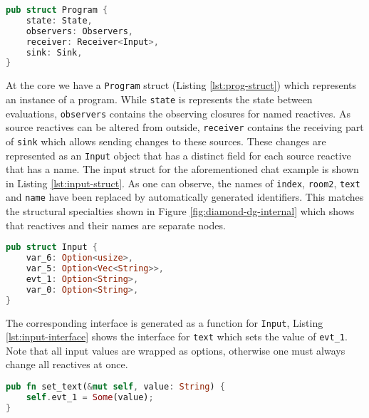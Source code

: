 \begin{lstlisting}[language=Rust,style=colouredRust,caption=Program struct,label=lst:prog-struct]
pub struct Program {
    state: State,
    observers: Observers,
    receiver: Receiver<Input>,
    sink: Sink,
}
\end{lstlisting}

At the core we have a \lstinline{Program} struct (Listing \ref{lst:prog-struct}) which represents an instance of a \rerust program. While \lstinline{state} is represents the state between evaluations, \lstinline{observers} contains the observing closures for named reactives. As source reactives can be altered from outside, \lstinline{receiver} contains the receiving part of \lstinline{sink} which allows sending changes to these sources. These changes are represented as an \lstinline{Input} object that has a distinct field for each source reactive that has a name. The input struct for the aforementioned chat example is shown in Listing \ref{lst:input-struct}. As one can observe, the names of \lstinline{index}, \lstinline{room2}, \lstinline{text} and \lstinline{name} have been replaced by automatically generated identifiers. This matches the structural specialties shown in Figure \ref{fig:diamond-dg-internal} which shows that reactives and their names are separate nodes. 

\begin{lstlisting}[language=Rust,style=colouredRust,caption=Input struct for chat example,label=lst:input-struct]
pub struct Input {
    var_6: Option<usize>,
    var_5: Option<Vec<String>>,
    evt_1: Option<String>,
    var_0: Option<String>,
}
\end{lstlisting}

The corresponding interface is generated as a function for \lstinline{Input}, Listing \ref{lst:input-interface} shows the interface for \lstinline{text} which sets the value of \lstinline{evt_1}. Note that all input values are wrapped as options, otherwise one must always change all reactives at once.

\begin{lstlisting}[language=Rust,style=colouredRust,caption=Input interface,label=lst:input-interface]
pub fn set_text(&mut self, value: String) {
    self.evt_1 = Some(value);
}
\end{lstlisting}

